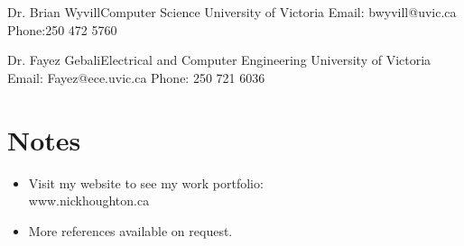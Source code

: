 \documentclass{tccv}
\begin{document}
\begin{factlist}
	\item{Dr. Brian Wyvill}{Computer Science
		University of Victoria
		Email: bwyvill@uvic.ca
		Phone:250 472 5760}
	\item{Dr. Fayez Gebali}{Electrical and Computer Engineering
		University of Victoria
		Email: Fayez@ece.uvic.ca
		Phone: 250 721 6036}
\end{factlist}
\section{Notes}
\begin{itemize}
	\item Visit my website to see my work portfolio: \\ www.nickhoughton.ca
	\item More references available on request.
\end{itemize}
\end{document}
